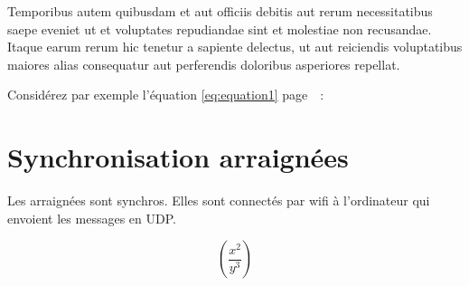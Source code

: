 Temporibus autem quibusdam et aut officiis debitis aut rerum necessitatibus saepe eveniet ut et voluptates repudiandae sint et molestiae non recusandae. Itaque earum rerum hic tenetur a sapiente delectus, ut aut reiciendis voluptatibus maiores alias consequatur aut perferendis doloribus asperiores repellat.
			

Considérez par exemple l'équation \ref{eq:equation1} page~\pageref{eq:equation1}~:

		\section{Synchronisation arraignées}

Les arraignées sont synchros. Elles sont connectés par wifi à l'ordinateur qui envoient les messages en UDP.

\begin{equation}
\left(\frac{x^2}{y^3}\right)
\label{eq:equation1}
\end{equation}

\clearemptydoublepage

